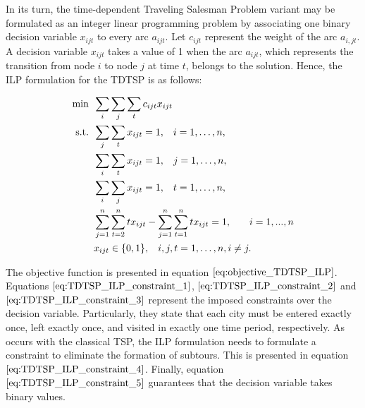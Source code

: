 
In its turn, the time-dependent Traveling Salesman Problem variant may be formulated as an integer linear programming problem by associating one binary decision variable $x_{ijt}$ to every arc $a_{ijt}$. Let $c_{ijt}$ represent the weight of the arc $a_{i,jt}$. A decision variable $x_{ijt}$ takes a value of 1 when the arc $a_{ijt}$, which represents the transition from node $i$ to node $j$ at time $t$, belongs to the solution. Hence, the ILP formulation for the TDTSP is as follows: 

\begin{align}
  \min  &\hspace{0.5em} \sum_{i}\sum_{j}\sum_{t} c_{ijt}x_{ijt} \label{eq:objective_TDTSP_ILP} \\
  \mathrm{s.t.}   &\hspace{0.5em} \sum_{j}\sum_{t}x_{ijt} = 1 , \hspace{3mm} i = 1, \ldots, n, \label{eq:TDTSP_ILP_constraint_1}\\
  & \hspace{0.5em} \sum_{i}\sum_{t}x_{ijt} = 1, \hspace{3mm} j = 1, \ldots, n, \label{eq:TDTSP_ILP_constraint_2}\\
    & \hspace{0.5em} \sum_{i}\sum_{j}x_{ijt} = 1, \hspace{3mm} t = 1, \ldots, n, \label{eq:TDTSP_ILP_constraint_3}\\
  & \hspace{0.5em} \sum_{j = 1}^{n}\sum_{t=2}^{n}tx_{ijt} - \sum_{j = 1}^{n}\sum_{t=1}^{n}tx_{ijt}  = 1, \hspace{3mm} \quad i = 1, ... ,n \label{eq:TDTSP_ILP_constraint_4}\\
  & \hspace{0.5em} x_{ijt} \in \{0, 1\}, \hspace{3mm} i, j, t = 1, \ldots, n, i \ne j. \label{eq:TDTSP_ILP_constraint_5}
\end{align}

The objective function is presented in equation $\ref{eq:objective_TDTSP_ILP}$. Equations $\ref{eq:TDTSP_ILP_constraint_1}$, $\ref{eq:TDTSP_ILP_constraint_2}$ and $\ref{eq:TDTSP_ILP_constraint_3}$ represent the imposed constraints over the decision variable. Particularly, they state that each city must be entered exactly once, left exactly once, and visited in exactly one time period, respectively. As occurs with the classical TSP, the ILP formulation needs to formulate a constraint to eliminate the  formation of subtours. This is presented in equation $\ref{eq:TDTSP_ILP_constraint_4}$. Finally, equation $\ref{eq:TDTSP_ILP_constraint_5}$ guarantees that the decision variable takes binary values.
